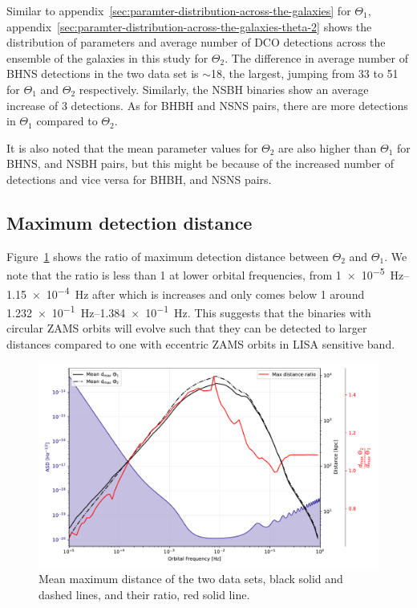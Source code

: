 \documentclass[journal, twocolumns]{IEEEtran}
\begin{document}
    Similar to appendix~\ref{sec:paramter-distribution-across-the-galaxies} for $\Theta_1$, appendix~\ref{sec:paramter-distribution-across-the-galaxies-theta-2} shows the distribution of parameters and average number of DCO detections across the ensemble of the galaxies in this study for $\Theta_2$.
    The difference in average number of BHNS detections in the two data set is $\sim$18, the largest, jumping from 33 to 51 for $\Theta_1$ and $\Theta_2$ respectively.
    Similarly, the NSBH binaries show an average increase of 3 detections. As for BHBH and NSNS pairs, there are more detections in $\Theta_1$ compared to $\Theta_2$.

    It is also noted that the mean parameter values for $\Theta_2$ are also higher than $\Theta_1$ for BHNS, and NSBH pairs, but this might be because of the increased number of detections and vice versa for BHBH, and NSNS pairs.

    \subsection{Maximum detection distance}
    Figure~\ref{fig:dmaxdifference} shows the ratio of maximum detection distance between $\Theta_2$ and $\Theta_1$.
    We note that the ratio is less than 1 at lower orbital frequencies, from \SIrange{1e-5}{1.15e-4}{\hertz} after which is increases and only comes below 1 around \SIrange{1.232e-1}{1.384e-1}{\hertz}.
    This suggests that the binaries with circular ZAMS orbits will evolve such that they can be detected to larger distances compared to one with eccentric ZAMS orbits in LISA sensitive band.

    \begin{figure}[!h]
        \centering
        \includegraphics[width=\columnwidth]{analysis_data/004__images_for_latex/d_max_difference}
        \caption{Mean maximum distance of the two data sets, black solid and dashed lines, and their ratio, red solid line.}
        \label{fig:dmaxdifference}
    \end{figure}
\end{document}
